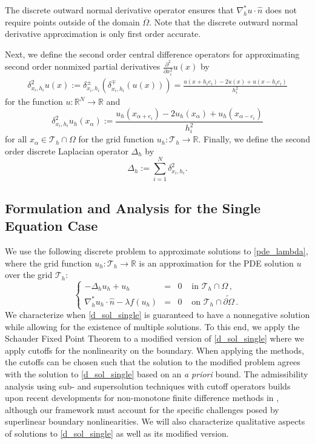\documentclass[12pt, reqno]{amsart}
\numberwithin{equation}{section}
\newcommand{\Om}{\Omega}
\begin{document}
The discrete outward normal derivative operator ensures that $\nabla^*_h u \cdot \widehat{n}$ does not require points outside of the domain $\overline{\Om}$. 
Note that the discrete outward normal derivative approximation is only first order accurate.  
\par Next, we define the second order central difference operators for approximating second order nonmixed partial derivatives $\frac{\partial^2}{\partial x_i^2}u(x)$ by
\begin{equation}\label{cdiff2}
 \begin{array}{rcl}
\delta^2_{x_i,h_i}u({x}):= \delta^\pm_{x_i,h_i}(\delta^\mp_{x_i,h_i}(u(x)))=\frac{u({x}+h_ie_i)-2u({x})+u({x}-h_ie_i)}{h_i^2}
\end{array}
\end{equation}
for the function $u:\mathbb{R}^N \to \mathbb{R}$ and 
\begin{equation}\label{grid2}
\delta^2_{x_i,h_i}u_{h}({x}_\alpha) :=\frac{u_{h}({x}_{\alpha+e_i})-2u_{h}({x}_\alpha)+u_{h}({x}_{\alpha-e_i})}{h_i^2}
\end{equation} for all $x_{\alpha} \in \mathcal{T}_h \cap \Omega$ for the grid function $u_h:\mathcal{T}_h \to \mathbb{R}$.
Finally, we define the second order discrete Laplacian operator  $\Delta_{{h}}$ by $$ \Delta_{{h}} := \sum_{i=1}^N\delta^2_{x_i,h_i}.$$

\subsection{Formulation and Analysis for the Single Equation Case}
\label{sec:FD_formulation}
We use the following discrete problem to approximate solutions to \eqref{pde_lambda}, 
where the grid function $u_{h} : \mathcal{T}_h \to \mathbb{R}$ is an approximation for the PDE solution $u$ 
over the grid $\mathcal{T}_h$:
\begin{equation}\label{d_sol_single}
    \left\lbrace\begin{array}{rcll}
    -\Delta_{h} u_{h}+ u_{h}&=&0 & \mbox{ in } \mathcal{T}_h \cap \Omega \,, \\
    \nabla_h^* u_{h}  \cdot \widehat{n} - \lambda f(u_{h}  ) &=& 0 & \mbox{ on } \mathcal{T}_h \cap \widetilde{\partial \Omega} \,. 
    \end{array}\right.
\end{equation}
We characterize when \eqref{d_sol_single} is guaranteed to have a nonnegative solution 
while allowing for the existence of multiple solutions.  
To this end, we apply the Schauder Fixed Point Theorem to a modified version of \eqref{d_sol_single} 
where we apply cutoffs for the nonlinearity on the boundary.  
When applying the methods, the cutoffs can be chosen such that the solution to the modified problem agrees with the solution to \eqref{d_sol_single} based on an {\it a priori} bound. The admissibility analysis using sub- and supersolution techniques with cutoff operators builds upon recent developments for non-monotone finite difference methods in \cite{Lewis_Xue_2025}, although our framework must account for the specific challenges posed by superlinear boundary nonlinearities.
We will also characterize qualitative aspects of solutions to \eqref{d_sol_single} as well as its modified version.  
\end{document}
